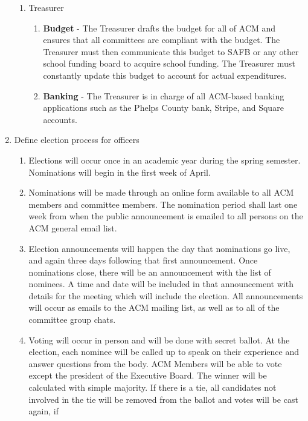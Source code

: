 \documentclass[11pt,a4paper,notitlepage]{article}
\begin{document}
\begin{enumerate}[label=\Alph*.]
\begin{enumerate}[label=\arabic*.]
      \item Treasurer
        \begin{enumerate}[label=\alph*.]
          \item \textbf{Budget} - The Treasurer drafts the budget for all of ACM
            and ensures that all committees are compliant with the budget. The
            Treasurer must then communicate this budget to SAFB or any other
            school funding board to acquire school funding. The Treasurer must
            constantly update this budget to account for actual expenditures.
          \item \textbf{Banking} - The Treasurer is in charge of all ACM-based
            banking applications such as the Phelps County bank, Stripe, and
            Square accounts.
        \end{enumerate}
    \end{enumerate}
  \item Define election process for officers
    \begin{enumerate}[label=\arabic*.]
      \item Elections will occur once in an academic year during the spring
      semester. Nominations will begin in the first week of April.
      \item Nominations will be made through an online form available to all ACM
      members and committee members. The nomination period shall last one week
      from when the public announcement is emailed to all persons on the ACM
      general email list.
      \item Election announcements will happen the day that nominations go live,
      and again three days following that first announcement. Once nominations
      close, there will be an announcement with the list of nominees. A time and
      date will be included in that announcement with details for the meeting
      which will include the election. All announcements will occur as emails to
      the ACM mailing list, as well as to all of the committee group chats.
      \item Voting will occur in person and will be done with secret ballot. At
      the election, each nominee will be called up to speak on their experience
      and answer questions from the body. ACM Members will be able to vote
      except the president of the Executive Board. The winner will be calculated
      with simple majority. If there is a tie, all candidates not involved in
      the tie will be removed from the ballot and votes will be cast again, if

\end{enumerate}
\end{enumerate}
\end{document}
